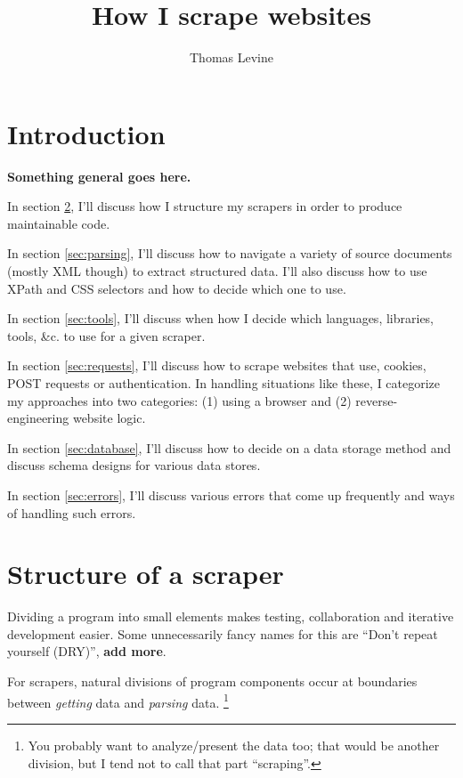 \documentclass{article}
\title{How I scrape websites}
\author{Thomas Levine}
\newcommand\todo[1]{\textbf{#1}}
\begin{document}
\maketitle
{}
\section{Introduction}
\todo{Something general goes here.}

In section \ref{sec:structure}, I'll discuss how I structure my
scrapers in order to produce maintainable code.

In section \ref{sec:parsing}, I'll discuss how to navigate a variety
of source documents (mostly XML though) to extract structured
data. I'll also discuss how to use XPath and CSS selectors and how
to decide which one to use.

In section \ref{sec:tools}, I'll discuss when how I decide which
languages, libraries, tools, \&c. to use for a given scraper.

In section \ref{sec:requests}, I'll discuss how to scrape websites
that use, cookies, POST requests or authentication. In handling
situations like these, I categorize my approaches into two categories:
(1) using a browser and (2) reverse-engineering website logic.

In section \ref{sec:database}, I'll discuss how to decide on a data
storage method and discuss schema designs for various data stores.

In section \ref{sec:errors}, I'll discuss various errors that come
up frequently and ways of handling such errors.

\section{Structure of a scraper}\label{sec:structure}
Dividing a program into small elements makes testing, collaboration
and iterative development easier. Some unnecessarily fancy names for
this are ``Don't repeat yourself (DRY)'', \todo{add more}.

For scrapers, natural divisions of program components occur at boundaries
between \emph{getting} data and \emph{parsing} data.
\footnote{You probably want to analyze/present the data too; that would be
another division, but I tend not to call that part ``scraping''.}
\end{document}
